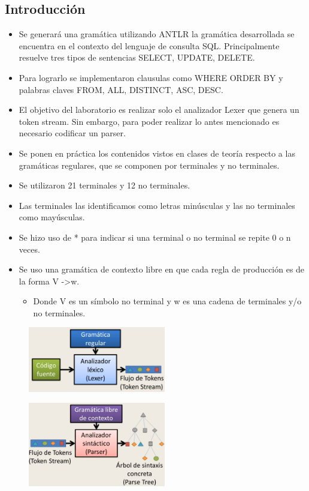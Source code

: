 \documentclass[a4paper,openright,14pt]{report}
\begin{document}
\subsection{Introducci\'on}
\begin{itemize}
\item Se generar\'a una gram\'atica utilizando ANTLR la gram\'atica desarrollada se encuentra en el contexto del lenguaje de consulta SQL. Principalmente resuelve tres tipos de sentencias SELECT, UPDATE, DELETE.
\item Para lograrlo se implementaron clausulas como WHERE ORDER BY y palabras claves FROM, ALL, DISTINCT, ASC, DESC.
\item El objetivo del laboratorio es realizar solo el analizador Lexer que genera un token stream. Sin embargo, para poder realizar lo antes mencionado es necesario codificar un parser.
\item Se ponen en pr\'actica los contenidos vistos en clases de teoría respecto a las gramáticas regulares, que se componen por terminales y no terminales.
\item Se utilizaron 21 terminales y 12 no terminales.
\item Las terminales las identificamos como letras min\'usculas y las no terminales como mayúsculas.
\item Se hizo uso de * para indicar si una terminal o no terminal se repite 0 o n veces.
\item Se uso una gram\'atica de contexto libre en que cada regla de producci\'on es de la forma V -\textgreater w.
	\begin{itemize}
	\item Donde V es un s\'imbolo no terminal y w es una cadena de 					terminales y/o no terminales.
	\end{itemize}
\end{itemize}
\begin{figure}[htb]
\begin{center}
\includegraphics[width=6cm]{imagen10}
\end{center}
\end{figure}
\begin{figure}[htb]
\begin{center}
\includegraphics[width=6cm]{imagen12}
\end{center}
\end{figure}
\end{document}
